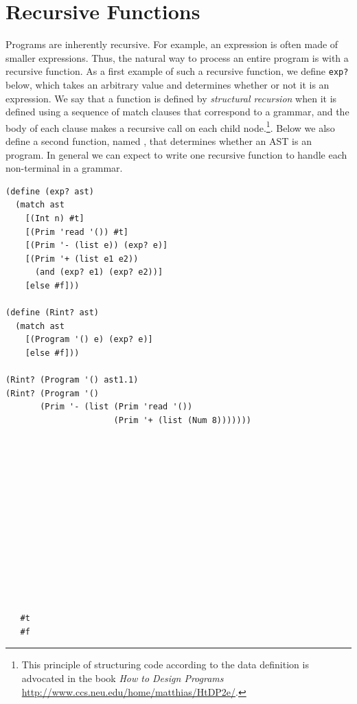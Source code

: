 \documentclass[11pt]{book}
\begin{document}
\section{Recursive Functions}
\label{sec:recursion}

Programs are inherently recursive. For example, an \LangInt{} expression is
often made of smaller expressions. Thus, the natural way to process an
entire program is with a recursive function.  As a first example of
such a recursive function, we define \texttt{exp?} below, which takes
an arbitrary value and determines whether or not it is an \LangInt{}
expression.
%
We say that a function is defined by \emph{structural recursion} when
it is defined using a sequence of match clauses that correspond to a
grammar, and the body of each clause makes a recursive call on each
child node.\footnote{This principle of structuring code according to
  the data definition is advocated in the book \emph{How to Design
    Programs} \url{http://www.ccs.neu.edu/home/matthias/HtDP2e/}.}.
Below we also define a second function, named , that
determines whether an AST is an \LangInt{} program.  In general we can
expect to write one recursive function to handle each non-terminal in
a grammar.
%
\begin{center}
\begin{minipage}{0.7\textwidth}
\begin{lstlisting}
(define (exp? ast)
  (match ast
    [(Int n) #t]
    [(Prim 'read '()) #t]
    [(Prim '- (list e)) (exp? e)]
    [(Prim '+ (list e1 e2))
      (and (exp? e1) (exp? e2))]
    [else #f]))

(define (Rint? ast)
  (match ast
    [(Program '() e) (exp? e)]
    [else #f]))

(Rint? (Program '() ast1.1)
(Rint? (Program '()
       (Prim '- (list (Prim 'read '())
                      (Prim '+ (list (Num 8)))))))
\end{lstlisting}
\end{minipage}
\vrule
\begin{minipage}{0.25\textwidth}
\begin{lstlisting}













   #t
   #f
\end{lstlisting}
\end{minipage}
\end{center}
\end{document}
